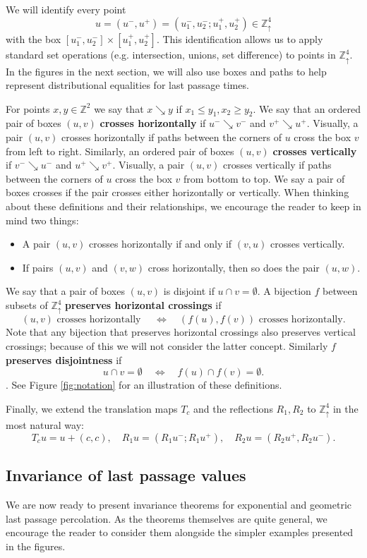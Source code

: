 \documentclass[aop, preprint]{imsart}
\theoremstyle{plain}
\theoremstyle{definition}
\theoremstyle{plain}
\newcommand{\Zd}{\mathds{Z}^4_\uparrow}
\newcommand{\Z}{\mathds{Z}}
\newcommand{\X}{\times}
\begin{document}
We will identify every point 
$$
u = (u^-, u^+) = (u^-_1, u^-_2; u^+_1, u^+_2) \in \Zd
$$
with the box $[u^-_1, u^-_2] \X [u^+_1, u^+_2]$. This identification allows us to apply standard set operations (e.g. intersection, unions, set difference) to points in $\Zd$. In the figures in the next section, we will also use boxes and paths to help represent distributional equalities for last passage times. 

For points $x, y \in \Z^2$ we say that $x \searrow y$ if $x_1 \le y_1, x_2 \ge y_2$. We say that an ordered pair of boxes $(u,v)$ \textbf{crosses horizontally} if $u^- \searrow v^-$ and $v^+ \searrow u^+$. Visually, a pair $(u, v)$ crosses horizontally if paths between the corners of $u$ cross the box $v$ from left to right. Similarly, an ordered pair of boxes $(u,v)$ \textbf{crosses vertically} if $v^- \searrow u^-$ and $u^+ \searrow v^+$. Visually, a pair $(u, v)$ crosses vertically if paths between the corners of $u$ cross the box $v$ from bottom to top. We say a pair of boxes crosses if the pair crosses either horizontally or vertically.
When thinking about these definitions and their relationships, we encourage the reader to keep in mind two things:
\begin{itemize}
	\item A pair $(u, v)$ crosses horizontally if and only if $(v, u)$ crosses vertically.
	\item If pairs $(u, v)$ and $(v, w)$ cross horizontally, then so does the pair $(u, w)$.
\end{itemize} 
 We say that a pair of boxes $(u, v)$ is disjoint if $u \cap v = \emptyset$.
A bijection $f$ between subsets of $\Zd$ \textbf{preserves horizontal crossings} if
$$
(u, v) \text{ crosses horizontally } \quad \iff \quad (f(u), f(v)) \text{ crosses horizontally}.
$$
Note that any bijection that preserves horizontal crossings also preserves vertical crossings; because of this we will not consider the latter concept. Similarly $f$ \textbf{preserves disjointness} if 
$$
u \cap v = \emptyset \quad \iff \quad f(u) \cap f(v) = \emptyset.
$$. 
See Figure \ref{fig:notation} for an illustration of these definitions. 

Finally, we extend the translation maps $T_c$ and the reflections $R_1, R_2$ to $\Zd$ in the most natural way: 
$$
T_c u = u + (c, c), \quad R_1 u = (R_1 u^-; R_1 u^+), \quad R_2 u = (R_2 u^+, R_2 u^-).
$$
\subsection{Invariance of last passage values}
\label{SS:symmetries-lpp}
We are now ready to present invariance theorems for exponential and geometric last passage percolation. As the theorems themselves are quite general, we encourage the reader to consider them alongside the simpler examples presented in the figures.
\end{document}
